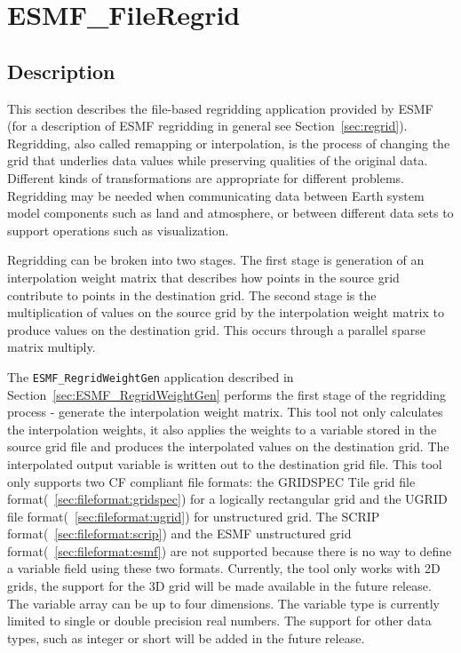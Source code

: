 
\section{ESMF\_FileRegrid}
\label{sec:ESMF_FileRegrid}

\subsection{Description}

This section describes the file-based regridding application provided by ESMF (for a description of ESMF regridding in general see Section~\ref{sec:regrid}). Regridding, also called remapping or interpolation, is the process of changing the grid that underlies data values while preserving qualities of the original data. Different kinds of transformations are appropriate for different problems. Regridding may be needed when communicating data between Earth system model components such as land and atmosphere, or between different data sets to support operations such as visualization. 

Regridding can be broken into two stages. The first stage is generation of an interpolation weight matrix that describes how points in
the source grid contribute to points in the destination grid. The second stage is the multiplication of values on the source grid by the
interpolation weight matrix to produce values on the destination grid. This occurs through a parallel sparse matrix multiply.

The {\tt ESMF\_RegridWeightGen} application described in Section~\ref{sec:ESMF_RegridWeightGen} 
performs the first stage of the regridding process - generate the interpolation weight matrix. 
This tool not only calculates the interpolation weights, it also applies the weights to a variable 
stored in the source grid file and produces the interpolated values on the destination grid. 
The interpolated output variable is written out to the destination grid file.  This tool only
supports two CF compliant file formats: the GRIDSPEC Tile grid file format(~\ref{sec:fileformat:gridspec}) for
a logically rectangular grid and the UGRID file format(~\ref{sec:fileformat:ugrid}) for unstructured grid.  
The SCRIP format(~\ref{sec:fileformat:scrip}) and the ESMF unstructured grid format(~\ref{sec:fileformat:esmf}) are not supported because there is no way to define a variable field using these two formats. Currently, the tool only works with 2D grids, the support for the 3D grid will be 
made available in the future release.  The variable array can be up to four dimensions.  The
variable type is currently limited to single or double precision real numbers.  The support for 
other data types, such as integer or short will be added in the future release.  

